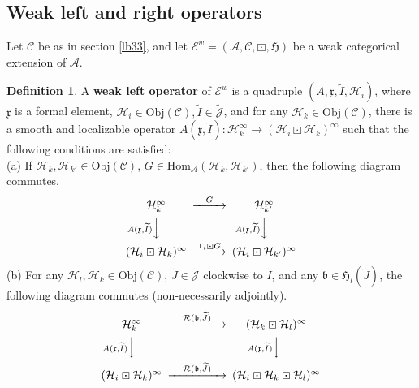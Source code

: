 \documentclass[11pt,b5paper,notitlepage]{article}
\theoremstyle{definition}
\newtheorem{df}{Definition}[subsection]
\theoremstyle{plain}
\newcommand{\fk}{\mathfrak}
\newcommand{\mc}{\mathcal}
\newcommand{\wtd}{\widetilde}
\newcommand{\id}{\mathbf{1}}
\newcommand{\Hom}{\mathrm{Hom}}
\newcommand{\scr}{\mathscr}
\newcommand{\Jtd}{\widetilde{\mathcal J}}
\newcommand{\Obj}{\mathrm{Obj}}
\numberwithin{equation}{subsection}
\begin{document}
\subsection{Weak left and right operators}\label{lb48}

Let $\scr C$ be as in section \ref{lb33}, and let $\scr E^w=(\mc A,\scr C,\boxdot,\fk H)$ be a weak categorical extension of $\mc A$.

\begin{df}\label{lb39}
	A \textbf{weak left operator} of $\scr E^w$ is a quadruple $(A,\fk x,\wtd I,\mc H_i)$, where $\fk x$ is a formal element, $\mc H_i\in\Obj(\scr C),\wtd I\in\Jtd$, and for any $\mc H_k\in\Obj(\scr C)$, there is a smooth and localizable operator $A(\fk x,\wtd I):\mc H_k^\infty\rightarrow(\mc H_i\boxdot\mc H_k)^\infty$ such that the following conditions are satisfied:\\
	(a) If $\mc H_k,\mc H_{k'}\in\Obj(\scr C)$, $G\in\Hom_{\mc A}(\mc H_k,\mc H_{k'})$, then  the following diagram commutes.
	\begin{gather}
	\begin{CD}
	\mc H_k^\infty @>G>> \mc H_{k'}^\infty\\
	@V A(\fk x,\wtd I)  VV @V A(\fk x,\wtd I)  VV\\
	(\mc H_i\boxdot\mc H_k)^\infty @> \id_i\boxdot G>> (\mc H_i\boxdot\mc H_{k'})^\infty
	\end{CD}
	\end{gather}
	(b) For any $\mc H_l,\mc H_k\in\Obj(\scr C)$,  $\wtd J\in\Jtd$  clockwise to $\wtd I$, and any $\fk b\in\fk H_l(\wtd J)$, the following diagram  commutes (non-necessarily adjointly).
	\begin{align}
	\begin{CD}
	\mc H_k^\infty @> \quad \mc R(\fk b,\wtd J)\quad   >> (\mc H_k\boxdot\mc H_l)^\infty\\
	@V A(\fk x,\wtd I)   V  V @V A(\fk x,\wtd I) VV\\
	(\mc H_i\boxdot\mc H_k)^\infty @> \quad \mc R(\fk b,\wtd J) \quad  >> (\mc H_i\boxdot\mc H_k\boxdot\mc H_l)^\infty
	\end{CD}
	\end{align}
	

\end{df}
\end{document}
